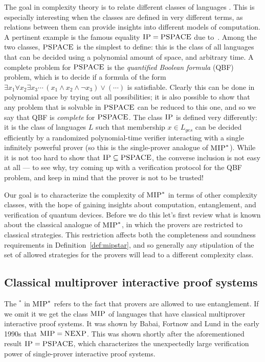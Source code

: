 The goal in complexity theory is to relate different classes of languages . This is especially interesting when the classes are defined in very different terms, as relations between them can provide insights into different models of computation. A pertinent example is the famous equality $\textsc{IP} = \textsc{PSPACE}$ due to~\cite{lund1992algebraic,shamir1992ip}. Among the two classes, $\textsc{PSPACE}$ is the simplest to define: this is the class of all languages that can be decided using a polynomial amount of space, and arbitrary time. A complete problem for $\textsc{PSPACE}$ is the \emph{quantified Boolean formula} (QBF) problem, which is to decide if a formula of the form $\exists x_1 \forall x_2 \exists x_3\cdots  \, (x_1 \wedge x_2 \wedge \neg x_3) \vee (\cdots)$ is satisfiable. Clearly this can be done in polynomial space by trying out all possibilities; it is also possible to show that any problem that is solvable in $\textsc{PSPACE}$ can be reduced to this one, and so we say that QBF is \emph{complete} for $\textsc{PSPACE}$. The class $\textsc{IP}$ is defined very differently: it is the class of languages $L$ such that membership $x\in L_{yes}$ can be decided efficiently by a randomized polynomial-time verifier interacting with a single infinitely powerful prover (so this is the single-prover analogue of $\textsc{MIP}^*$).  While it is not too hard to show that $\textsc{IP} \subseteq \textsc{PSPACE}$, the converse inclusion is not easy at all --- to see why, try coming up with a verification protocol for the QBF problem, and keep in mind that the prover is not to be trusted!

Our goal is to characterize the complexity of $\textsc{MIP}^*$ in terms of other complexity classes, with the hope of gaining insights about computation, entanglement, and verification of quantum devices. Before we do this let's first review what is known about the classical analogue of $\textsc{MIP}^*$, in which the provers are restricted to classical strategies.  This restriction affects both the completeness and soundness requirements in Definition~\ref{def:mipstar}, and so generally any stipulation of the set of allowed strategies for the provers will lead to a different complexity class. 


\subsection{Classical multiprover interactive proof systems}

The $^*$ in $\textsc{MIP}^*$ refers to the fact that provers are allowed to use entanglement. If we omit it we get the class $\textsc{MIP}$ of languages that have classical multiprover interactive proof systems. It was shown by Babai, Fortnow and Lund in the early 1990s that $\textsc{MIP} =  \textsc{NEXP}$. This was shown shortly after the aforementioned result $\textsc{IP} = \textsc{PSPACE}$, which characterizes the unexpectedly large verification power of single-prover interactive proof systems.  

